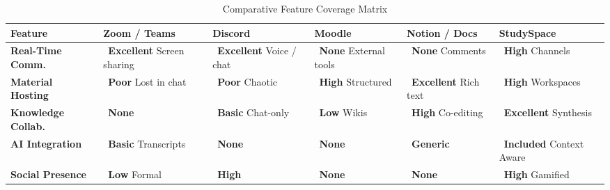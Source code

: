 \documentclass[11pt, a4paper]{article}
\newcommand{\statGreen}[1]{\raisebox{-0.45ex}{\textcolor{statusGreen}{\huge$\bullet$}}\ \textbf{#1}}
\newcommand{\statYellow}[1]{\raisebox{-0.45ex}{\textcolor{statusYellow}{\huge$\bullet$}}\ \textbf{#1}}
\newcommand{\statRed}[1]{\raisebox{-0.45ex}{\textcolor{statusRed}{\huge$\bullet$}}\ \textbf{#1}}
\begin{document}
\begin{table}[h]
    \centering
    \footnotesize
    \renewcommand{\arraystretch}{2.2}
    \setlength{\tabcolsep}{4pt}
    \caption{Comparative Feature Coverage Matrix}

    \begin{tabularx}{\textwidth}{|p{3.2cm}|X|X|X|X|X|}
    \hline
    \textbf{Feature} & \textbf{Zoom / Teams} & \textbf{Discord} & \textbf{Moodle} & \textbf{Notion / Docs} & \textbf{StudySpace} \\
    \hline

    \textbf{Real-Time Comm.} &
    \statGreen{Excellent} \newline Screen sharing &
    \statGreen{Excellent} \newline Voice / chat &
    \statRed{None} \newline External tools &
    \statRed{None} \newline Comments &
    \statGreen{High} \newline Channels \\ \hline

    \textbf{Material Hosting} &
    \statRed{Poor} \newline Lost in chat &
    \statRed{Poor} \newline Chaotic &
    \statGreen{High} \newline Structured &
    \statGreen{Excellent} \newline Rich text &
    \statGreen{High} \newline Workspaces \\ \hline

    \textbf{Knowledge Collab.} &
    \statRed{None} &
    \statYellow{Basic} \newline Chat-only &
    \statYellow{Low} \newline Wikis &
    \statGreen{High} \newline Co-editing &
    \statGreen{Excellent} \newline Synthesis \\ \hline

    \textbf{AI Integration} &
    \statYellow{Basic} \newline Transcripts &
    \statRed{None} &
    \statRed{None} &
    \statYellow{Generic} &
    \statGreen{Included} \newline Context Aware  \\ \hline

    \textbf{Social Presence} &
    \statYellow{Low} \newline Formal  &
    \statGreen{High} &
    \statRed{None} &
    \statRed{None} &
    \statGreen{High} \newline Gamified  \\ \hline


\end{tabularx}
\end{table}
\end{document}
